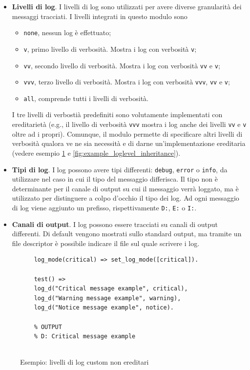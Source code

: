 \documentclass[12pt,a4paper,openright]{book} %
\begin{document}
\begin{itemize}
	\item \textbf{Livelli di log}. I livelli di log sono utilizzati per avere diverse granularità dei messaggi tracciati. I livelli integrati in questo modulo sono 
	\begin{itemize}
		\item \texttt{none}, nessun log è effettuato;
		\item \texttt{v}, primo livello di verbosità. Mostra i log con verbosità \texttt{v};
		\item \texttt{vv}, secondo livello di verbosità. Mostra i log con verbosità \texttt{vv} e \texttt{v};
		\item \texttt{vvv}, terzo livello di verbosità. Mostra i log con verbosità \texttt{vvv}, \texttt{vv} e \texttt{v};
		\item \texttt{all}, comprende tutti i livelli di verbosità.
	\end{itemize}
	I tre livelli di verbostià predefiniti sono volutamente implementati con ereditarietà (e.g., il livello di verbosità \texttt{vvv} mostra i log anche dei livelli \texttt{vv} e \texttt{v} oltre ad i propri). Comunque, il modulo permette di specificare altri livelli di verbosità qualora ve ne sia necessità e di darne un'implementazione ereditaria (vedere esempio \ref{fig:example_loglevel_noinheritance} e \ref{fig:example_loglevel_inheritance}).
	
	\item \textbf{Tipi di log}. I log possono avere tipi differenti: \texttt{debug}, \texttt{error} o \texttt{info}, da utilizzare nel caso in cui il tipo del messaggio differisca. Il tipo non è determinante per il canale di output su cui il messaggio verrà loggato, ma è utilizzato per distinguere a colpo d'occhio il tipo dei log. Ad ogni messaggio di log viene aggiunto un prefisso, rispettivamente \texttt{D:}, \texttt{E:} o \texttt{I:}.
	
	\item \textbf{Canali di output}. I log possono essere tracciati su  canali di output differenti. Di default vengono mostrati sullo standard output, ma tramite un file descriptor è possibile indicare il file sul quale scrivere i log.
\end{itemize}

\begin{figure}
	\begin{verbatim}
	log_mode(critical) => set_log_mode([critical]).
	
	test() =>
	log_d("Critical message example", critical),
	log_d("Warning message example", warning),
	log_d("Notice message example", notice).
	
	% OUTPUT
	% D: Critical message example
	
	\end{verbatim}
	
	\caption{Esempio: livelli di log custom non ereditari}
	\label{fig:example_loglevel_noinheritance}
\end{figure}
\end{document}
